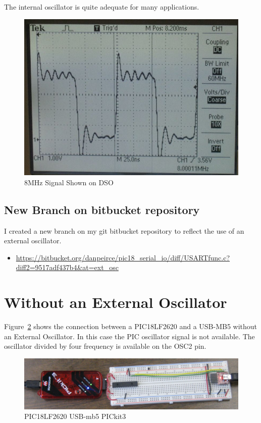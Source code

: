 \documentclass[twocolumn]{article}
\makeatletter
\def\maxwidth{\ifdim\Gin@nat@width>\linewidth\linewidth
\else\Gin@nat@width\fi}
\let\Oldincludegraphics\includegraphics
\renewcommand{\includegraphics}[1]{\Oldincludegraphics[width=\maxwidth]{#1}}
\makeatother
\begin{document}
The internal oscillator is quite adequate for many applications.

\begin{figure}[htbp]
\centering
\includegraphics{phys1600/input_to_osc1_pic.jpg}
\caption{8MHz Signal Shown on DSO}
\label{osc8mhzsignaldso}
\end{figure}

\subsection{New Branch on bitbucket repository}

I created a new branch on my git bitbucket repository to reflect the use
of an external oscillator.

\begin{itemize}
\item
  \url{https://bitbucket.org/danpeirce/pic18\_serial\_io/diff/USARTfunc.c?diff2=9517adf437b4\&at=ext\_osc}
\end{itemize}


\section{Without an External Oscillator}

Figure~\ref{pic18lf2620usbmb5} shows the connection between a PIC18LF2620 and a USB-MB5 without an External Oscillator. In this case the PIC oscillator signal is not available. The oscillator divided by four frequency is available on the OSC2 pin.

\begin{figure}[htbp]
\centering
\includegraphics{phys1600/pic18lf2620_usbmb5_pickit3.jpg}
\caption{PIC18LF2620 USB-mb5 PICkit3}
\label{pic18lf2620usbmb5}
\end{figure}
\end{document}
